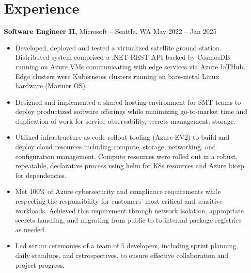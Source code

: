 \documentclass[11pt]{article}       %
\begin{document}
\section*{Experience}
\textbf{Software Engineer II,} {Microsoft} -- Seattle, WA \hfill May 2022 -- Jan 2025 \\
\vspace{-9pt}
\begin{itemize}
  \item Developed, deployed and tested a virtualized satellite ground station. Distributed system comprised a .NET REST API backed by CosmosDB running on Azure VMs communicating with edge services via Azure IoTHub. Edge clusters were Kubernetes clusters running on bare-metal Linux hardware (Mariner OS).
  \item Designed and implemented a shared hosting environment for SMT teams to deploy productized software offerings while minimizing go-to-market time and duplication of work for service observability, secrets management, storage.
  \item Utilized infrastructure as code rollout tooling (Azure EV2) to build and deploy cloud resources including compute, storage, networking, and configuration management. Compute resources were rolled out in a robust, repeatable, declarative process using helm for K8s resources and Azure bicep for dependencies.
  \item Met 100\% of Azure cybersecurity and compliance requirements while respecting the responsibility for customers' most critical and sensitive workloads. Achieved this requirement through network isolation, appropriate secrets handling, and migrating from public to to internal package registries as needed.
  \item Led scrum ceremonies of a team of 5 developers, including sprint planning, daily standups, and retrospectives, to ensure effective collaboration and project progress.
\end{itemize}
\end{document}
